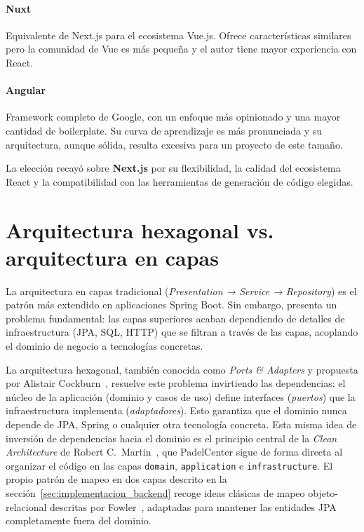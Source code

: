 \paragraph{Nuxt} Equivalente de Next.js para el ecosistema Vue.js. Ofrece
características similares pero la comunidad de Vue es más pequeña y el autor
tiene mayor experiencia con React.

\paragraph{Angular} Framework completo de Google, con un enfoque más opinionado
y una mayor cantidad de boilerplate. Su curva de aprendizaje es más pronunciada
y su arquitectura, aunque sólida, resulta excesiva para un proyecto de este
tamaño.

La elección recayó sobre \textbf{Next.js} por su flexibilidad, la calidad del
ecosistema React y la compatibilidad con las herramientas de generación de código
elegidas.

\section{Arquitectura hexagonal vs. arquitectura en capas}
\label{sec:arquitectura_comparativa}

La arquitectura en capas tradicional (\textit{Presentation → Service → Repository})
es el patrón más extendido en aplicaciones Spring Boot. Sin embargo, presenta
un problema fundamental: las capas superiores acaban dependiendo de detalles de
infraestructura (JPA, SQL, HTTP) que se filtran a través de las capas, acoplando
el dominio de negocio a tecnologías concretas.

La arquitectura hexagonal, también conocida como \textit{Ports \& Adapters} y
propuesta por Alistair Cockburn~\cite{cockburn2005hexagonal}, resuelve este
problema invirtiendo las dependencias: el núcleo de la aplicación (dominio y
casos de uso) define interfaces (\textit{puertos}) que la infraestructura
implementa (\textit{adaptadores}). Esto garantiza que el dominio nunca depende
de JPA, Spring o cualquier otra tecnología concreta. Esta misma idea de
inversión de dependencias hacia el dominio es el principio central de la
\textit{Clean Architecture} de Robert C.~Martin~\cite{martin2017cleanarchitecture},
que PadelCenter sigue de forma directa al organizar el código en las capas
\texttt{domain}, \texttt{application} e \texttt{infrastructure}. El propio
patrón de mapeo en dos capas descrito en la sección~\ref{sec:implementacion_backend}
recoge ideas clásicas de mapeo objeto-relacional descritas por
Fowler~\cite{fowler2002peaa}, adaptadas para mantener las entidades JPA
completamente fuera del dominio.

